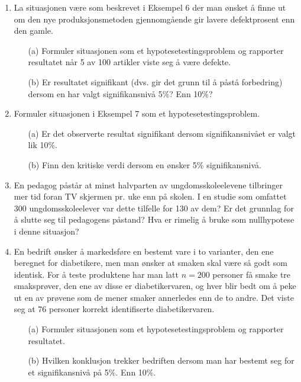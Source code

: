 \begin{enumerate}
\item La situasjonen være som beskrevet i Eksempel 6 der man
ønsket å finne ut om den nye produksjonsmetoden
gjennomgående gir lavere defektprosent enn den gamle.
\begin{itemize}
\item[(a)] Formuler situasjonen som et hypotesetestingsproblem og
   rapporter resultatet når 5 av 100 artikler viste seg å
   være defekte.
\item[(b)] Er resultatet signifikant (dvs. gir det grunn til å
   påstå forbedring) dersom en har valgt signifikansnivå
   5\%? Enn 10\%?
\end{itemize}

\item Formuler situasjonen i Eksempel 7 som et
hypotesetestingsproblem.
\begin{itemize}
\item[(a)] Er det observerte resultat signifikant dersom
    signifikansnivået er valgt lik 10\%.
\item[(b)] Finn den kritiske verdi dersom en ønsker 5\%
signifikansnivå.
\end{itemize}

\item En pedagog påstår at minst halvparten av ungdomsskoleelevene
tilbringer mer tid foran TV skjermen pr. uke enn på skolen.  I en
studie som omfattet 300 ungdomsskoleelever var dette tilfelle for 
130 av dem?  Er det grunnlag for å slutte seg til pedagogens
påstand?  Hva er rimelig å bruke som nullhypotese i denne situasjon?

\item En bedrift ønsker å markedsføre en bestemt vare i to
varianter, den ene beregnet for diabetikere, men man ønsker
at smaken skal være så godt som identisk. For å teste
produktene har man latt $n=200$ personer få smake tre
smaksprøver, den ene av disse er diabetikervaren, og hver
blir bedt om å peke ut en av prøvene som de mener smaker
annerledes enn de to andre. Det viste seg at 76 personer
korrekt identifiserte diabetikervaren.
\begin{itemize}
\item[(a)]Formuler situasjonen som et hypotesetestingsproblem og
  rapporter resultatet.
\item[(b)] Hvilken konklusjon trekker bedriften dersom man har
   bestemt seg for et signifikansnivå på 5\%. Enn 10\%.
\end{itemize}


\end{enumerate}
